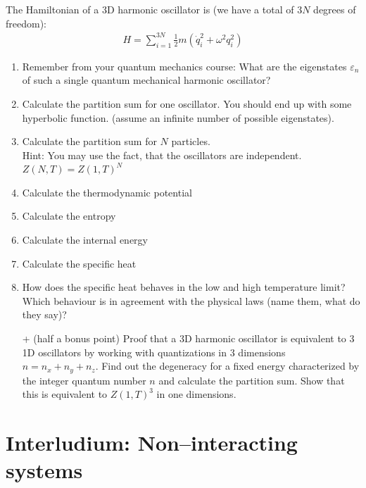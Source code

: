 \documentclass[12pt,a4paper]{article} %
\begin{document}
 The Hamiltonian of a 3D harmonic oscillator is (we have a total of $3N$ degrees of freedom):
 \begin{align}
  H = \sum_{i = 1}^{3N} \frac{1}{2} m (\dot{q}_i^2 + \omega^2 q_i^2)
 \end{align}
\begin{enumerate}
 \item Remember from your quantum mechanics course: What are the eigenstates $\varepsilon_n$ of such a single quantum mechanical harmonic oscillator? 
 \item Calculate the partition sum for one oscillator. You should end up with some hyperbolic function. (assume an infinite number of possible eigenstates).
 \item Calculate the partition sum for $N$ particles. \\
 Hint: You may use the fact, that the oscillators are independent. $Z(N,T) = Z(1,T)^N$
 \item Calculate the thermodynamic potential
 \item Calculate the entropy
 \item Calculate the internal energy
 \item Calculate the specific heat
 \item How does the specific heat behaves in the low and high temperature limit?\\
 Which behaviour is in agreement with the physical laws (name them, what do they say)?
 \item[+] (half a bonus point) Proof that a 3D harmonic oscillator is equivalent to 3 1D oscillators by working with quantizations in 3 dimensions $n = n_x + n_y + n_z$. Find out the degeneracy for a fixed  energy characterized by the integer quantum number $n$ and calculate the partition sum. Show that this is equivalent to $Z(1,T)^3$ in one dimensions.
\end{enumerate}

\section*{Interludium: Non--interacting systems}
\end{document}
